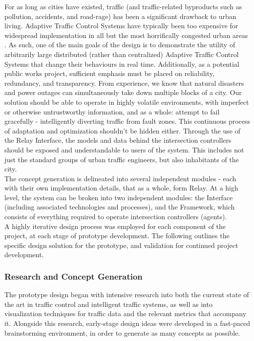 \documentclass{article}
\begin{document}
For as long as cities have existed, traffic (and traffic-related byproducts such as pollution, accidents, and road-rage) has been a significant drawback to urban living.
Adaptive Traffic Control Systems have typically been too expensive for widespread implementation in all but the most horrifically congested urban areas \cite{la-atcs-article}.
As such, one of the main goals of the design is to demonstrate the utility of arbitrarily large distributed (rather than centralized) Adaptive Traffic Control Systems that change their behaviours in real time.
Additionally, as a potential public works project, sufficient emphasis must be placed on reliability, redundancy, and transparency.
From experience, we know that natural disasters and power outages can simultaneously take down multiple blocks of a city.
Our solution should be able to operate in highly volatile environments, with imperfect or otherwise untrustworthy information, and as a whole: attempt to fail gracefully - intelligently diverting traffic from fault zones.
This continuous process of adaptation and optimization shouldn't be hidden either.
Through the use of the Relay Interface, the models and data behind the intersection controllers should be exposed and understandable to users of the system.
This includes not just the standard groups of urban traffic engineers, but also inhabitants of the city.\\

The concept generation is delineated into several independent modules - each with their own implementation details, that as a whole, form Relay.
At a high level, the system can be broken into two independent modules: the Interface (including associated technologies and processes), and the Framework, which consists of everything required to operate intersection controllers (agents).\\

A highly iterative design process was employed for each component of the project, at each stage of prototype development.
The following outlines the specific design solution for the prototype, and validation for continued project development.\\

\subsubsection{Research and Concept Generation}

The prototype design began with intensive research into both the current state of the art in traffic control and intelligent traffic systems, as well as into visualization techniques for traffic data and the relevant metrics that accompany it.
Alongside this research, early-stage design ideas were developed in a fast-paced brainstorming environment, in order to generate as many concepts as possible.\\
\end{document}
